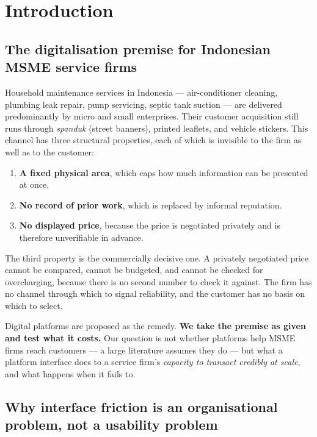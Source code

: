 \documentclass[]{interact}
\theoremstyle{plain}
\begin{document}
\section{Introduction}

\subsection{The digitalisation premise for Indonesian MSME service firms}

Household maintenance services in Indonesia --- air-conditioner cleaning, plumbing leak repair, pump
servicing, septic tank suction --- are delivered predominantly by micro and small enterprises. Their
customer acquisition still runs through \emph{spanduk} (street banners), printed leaflets, and vehicle
stickers. This channel has three structural properties, each of which is invisible to the firm as well
as to the customer:

\begin{enumerate}
\item \textbf{A fixed physical area}, which caps how much information can be presented at once.
\item \textbf{No record of prior work}, which is replaced by informal reputation.
\item \textbf{No displayed price}, because the price is negotiated privately and is therefore
      unverifiable in advance.
\end{enumerate}

The third property is the commercially decisive one. A privately negotiated price cannot be compared,
cannot be budgeted, and cannot be checked for overcharging, because there is no second number to check
it against. The firm has no channel through which to signal reliability, and the customer has no basis
on which to select.

Digital platforms are proposed as the remedy. \textbf{We take the premise as given and test what it
costs.} Our question is not whether platforms help MSME firms reach customers --- a large literature
assumes they do --- but what a platform interface does to a service firm's \emph{capacity to transact
credibly at scale}, and what happens when it fails to.

\subsection{Why interface friction is an organisational problem, not a usability problem}
\end{document}
